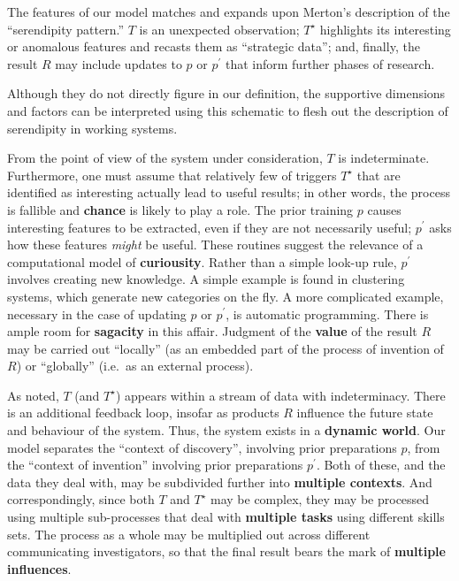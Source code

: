 
The features of our model matches and expands upon Merton's \citeyear{merton1948bearing} description of the ``serendipity pattern.'' $T$ is an unexpected observation; $T^\star$ highlights its interesting or anomalous features and recasts them as ``strategic data''; and, finally, the result $R$ may include updates to $p$ or $p^{\prime}$ that inform further phases of research.  

Although they do not directly figure in our definition, the supportive
dimensions and factors can be interpreted using this schematic to
flesh out the description of serendipity in working systems.

From the point of view of the system under consideration, $T$ is
indeterminate.  Furthermore, one must assume that relatively few of
triggers $T^\star$ that are identified as interesting actually lead to
useful results; in other words, the process is fallible and
\textbf{chance} is likely to play a role.
%
The prior training $p$ causes interesting features
to be extracted, even if they are not necessarily useful; $p^{\prime}$
asks how these features \emph{might} be useful.  These routines 
suggest the relevance of a computational model of \textbf{curiousity}.
%
Rather than a simple look-up rule, $p^{\prime}$ involves creating new knowledge.  A simple example is found in clustering systems, which generate new categories on the fly.  A more complicated example, necessary in the case of updating $p$ or $p^{\prime}$, is automatic programming.  There is ample room for \textbf{sagacity} in this affair.
%
Judgment of the \textbf{value} of the result $R$ may be carried out
``locally'' (as an embedded part of the process of invention of $R$)
or ``globally'' (i.e.~as an external process).

As noted, $T$ (and $T^\star$) appears within a stream of data with
indeterminacy.  There is an additional feedback loop, insofar as
products $R$ influence the future state and behaviour of the system.
Thus, the system exists in a \textbf{dynamic world}.
%
Our model separates the
``context of discovery'', involving prior preparations $p$, from the
``context of invention'' involving prior preparations $p^{\prime}$.
Both of these, and the data they deal with, may be subdivided further into \textbf{multiple contexts}. 
%
And correspondingly, since both $T$ and $T^\star$ may be complex, they
may be processed using multiple sub-processes that deal with
\textbf{multiple tasks} using different skills sets.
%
The process as a whole may be multiplied out across different
communicating investigators, so that the final result bears the mark
of \textbf{multiple influences}.





